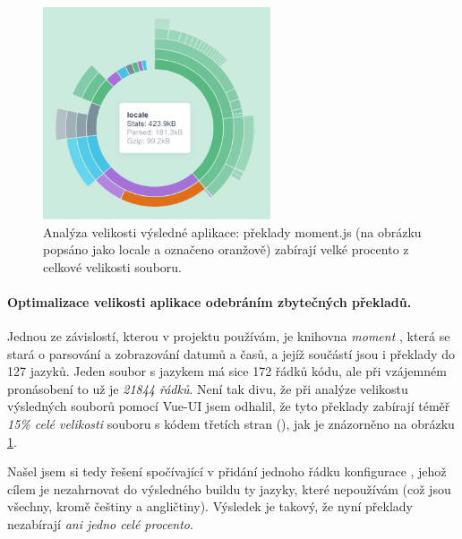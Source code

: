 \begin{figure}[h]
\includegraphics[width=0.6\textwidth]{../png/cli/analyze-moment.png}
\caption[Analýza velikosti výsledné aplikace: překlady moment.js]{Analýza velikosti výsledné aplikace: překlady moment.js (na obrázku popsáno jako locale a označeno oranžově) zabírají velké procento z celkové velikosti souboru.} \label{picture:cli:analyze}
\end{figure}

\paragraph{Optimalizace velikosti aplikace odebráním zbytečných překladů.} Jednou ze závislostí, kterou v projektu používám, je knihovna \emph{moment} \cite{momentjs}, která se stará o parsování a zobrazování datumů a časů, a jejíž součástí jsou i překlady do 127 jazyků. Jeden soubor s jazykem má sice  172 řádků kódu, ale při vzájemném pronásobení to už je \emph{21844 řádků}. Není tak divu, že při analýze velikostu výsledných souborů pomocí Vue-UI jsem odhalil, že tyto překlady zabírají téměř \emph{15\% celé velikosti} souboru s kódem třetích stran (), jak je znázorněno na obrázku \ref{picture:cli:analyze}.

Našel jsem si tedy řešení spočívající v přidání jednoho řádku konfigurace \cite{momentjs-ignore-locale}, jehož cílem je nezahrnovat do výsledného buildu ty jazyky, které nepoužívám (což jsou všechny, kromě češtiny a angličtiny). Výsledek je takový, že nyní překlady nezabírají \emph{ani jedno celé procento}.


